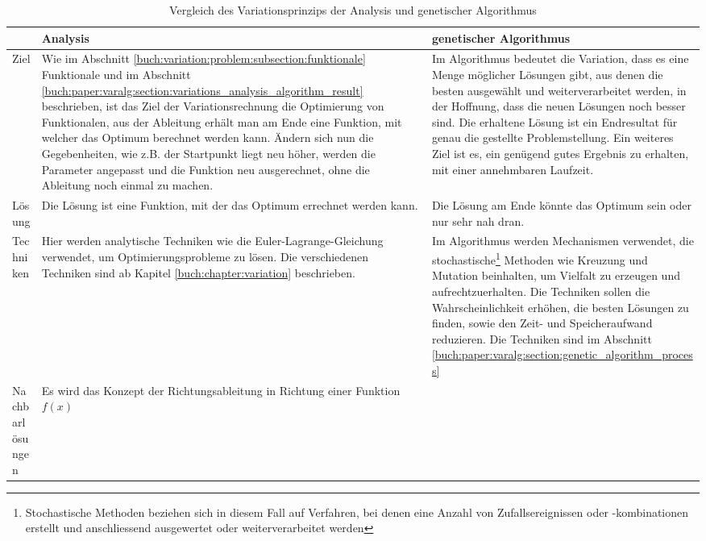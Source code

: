 \begin{xltabular}{\textwidth}{|L|X|X|}
    \caption{Vergleich des Variationsprinzips der Analysis und genetischer Algorithmus}
    \label{tab:variation_comparison} \\
    \hline
    & Analysis 
    & genetischer Algorithmus 
    \\ \hline
    Ziel
    & 
    Wie im Abschnitt \ref{buch:variation:problem:subsection:funktionale} Funktionale und
    im Abschnitt \ref{buch:paper:varalg:section:variations_analysis_algorithm_result}
    beschrieben, ist das Ziel der Variationsrechnung die Optimierung von Funktionalen, aus der
    Ableitung erhält man am Ende eine Funktion, mit welcher das Optimum berechnet werden kann. 
    Ändern sich nun die Gegebenheiten, wie z.B. der Startpunkt liegt neu höher, werden die Parameter 
    angepasst und die Funktion neu ausgerechnet, ohne die Ableitung noch einmal zu machen.
    & 
    Im Algorithmus bedeutet die Variation, dass es eine Menge möglicher Lösungen gibt, 
    aus denen die besten ausgewählt und weiterverarbeitet werden, in der 
    Hoffnung, dass die neuen Lösungen noch besser sind. Die erhaltene Lösung ist ein Endresultat für
    genau die gestellte Problemstellung. Ein weiteres Ziel ist es,
    ein genügend gutes Ergebnis zu erhalten, mit einer annehmbaren Laufzeit.
    \\ \hline
    Lösung
    & 
    Die Lösung ist eine Funktion, mit der das Optimum errechnet werden kann.
    & 
    Die Lösung am Ende könnte das Optimum sein oder nur sehr nah dran.
    \\ \hline
    Techniken  
    & 
    Hier werden analytische Techniken wie die Euler-Lagrange-Gleichung verwendet, 
    um Optimierungsprobleme zu lösen. Die verschiedenen Techniken sind ab Kapitel
    \ref{buch:chapter:variation} beschrieben.
    & Im Algorithmus werden Mechanismen verwendet, die stochastische\footnote{
        Stochastische Methoden beziehen sich in diesem Fall auf Verfahren, bei denen 
        eine Anzahl von Zufallsereignissen oder -kombinationen erstellt und anschliessend 
        ausgewertet oder weiterverarbeitet werden
    }
    Methoden wie Kreuzung und Mutation beinhalten, um Vielfalt zu erzeugen und aufrechtzuerhalten.
    Die Techniken sollen die Wahrscheinlichkeit erhöhen, die besten Lösungen zu finden, 
    sowie den Zeit- und Speicheraufwand reduzieren.
    Die Techniken sind im Abschnitt \ref{buch:paper:varalg:section:genetic_algorithm_process}
    \\ \hline
    Nachbarlösungen
    & 
    Es wird das Konzept der Richtungsableitung in Richtung einer Funktion \(f(x)\)

\end{xltabular}
